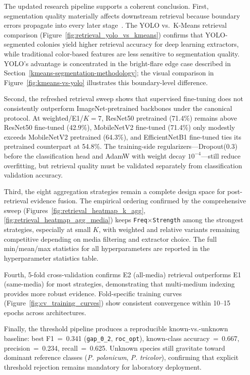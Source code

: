 The updated research pipeline supports a coherent conclusion. First, segmentation quality materially affects downstream retrieval because boundary errors propagate into every later stage~\cite{colonyYOLO2025,silva2025dlColony}. The YOLO vs.\ K-Means retrieval comparison (Figure~\ref{fig:retrieval_yolo_vs_kmeans}) confirms that YOLO-segmented colonies yield higher retrieval accuracy for deep learning extractors, while traditional color-based features are less sensitive to segmentation quality. YOLO's advantage is concentrated in the bright-flare edge case described in Section~\ref{kmeans-segmentation-methodology}; the visual comparison in Figure~\ref{fig:kmeans-vs-yolo} illustrates this boundary-level difference.

Second, the refreshed retrieval sweep shows that supervised fine-tuning does not consistently outperform ImageNet-pretrained backbones under the canonical protocol. At weighted/E1/$K=7$, ResNet50 pretrained (71.4\%) remains above ResNet50 fine-tuned (42.9\%), MobileNetV2 fine-tuned (71.4\%) only modestly exceeds MobileNetV2 pretrained (64.3\%), and EfficientNetB1 fine-tuned ties its pretrained counterpart at 54.8\%. The training-side regularizers---Dropout(0.3) before the classification head and AdamW with weight decay $10^{-4}$---still reduce overfitting, but retrieval quality must be validated separately from classification validation accuracy.

Third, the eight aggregation strategies remain a complete design space for post-retrieval evidence fusion. The empirical ordering confirmed by the comprehensive sweep (Figures~\ref{fig:retrieval_heatmap_k_agg}, \ref{fig:retrieval_heatmap_agg_media}) keeps \texttt{Freq$\times$Strength} among the strongest strategies, especially at small $K$, with weighted and relative variants remaining competitive depending on media filtering and extractor choice. The full min/mean/max statistics for all hyperparameters are reported in the hyperparameter statistics table.

Fourth, 5-fold cross-validation confirms E2 (all-media) retrieval outperforms E1 (same-media) for most strategies, demonstrating that multi-medium indexing provides more robust evidence. Fold-specific training curves (Figure~\ref{fig:cv_training_curves}) show consistent convergence within 10--15 epochs across architectures.

Finally, the threshold pipeline produces a reproducible known-vs.-unknown baseline: best F1~=~0.341 (\texttt{gap\_0\_2}, \texttt{roc\_opt}), known-class accuracy~=~0.667, precision~=~0.234, recall~=~0.625. Unknown species still gravitate toward dominant reference classes (\emph{P. polonicum}, \emph{P. tricolor}), confirming that explicit threshold rejection remains mandatory for laboratory deployment.
